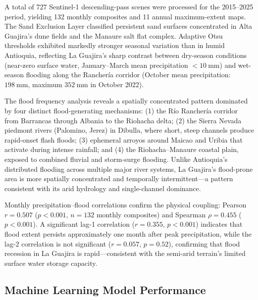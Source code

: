 \documentclass{article}
\begin{document}
A total of 727 Sentinel-1 descending-pass scenes were processed for the 2015--2025 period, yielding 132 monthly composites and 11 annual maximum-extent maps. The Sand Exclusion Layer classified persistent sand surfaces concentrated in Alta Guajira's dune fields and the Manaure salt flat complex. Adaptive Otsu thresholds exhibited markedly stronger seasonal variation than in humid Antioquia, reflecting La Guajira's sharp contrast between dry-season conditions (near-zero surface water, January--March mean precipitation $< \SI{10}{\milli\metre}$) and wet-season flooding along the Rancher\'ia corridor (October mean precipitation: $\SI{198}{\milli\metre}$, maximum $\SI{352}{\milli\metre}$ in October 2022).

The flood frequency analysis reveals a spatially concentrated pattern dominated by four distinct flood-generating mechanisms: (1) the R\'io Rancher\'ia corridor from Barrancas through Albania to the Riohacha delta; (2) the Sierra Nevada piedmont rivers (Palomino, Jerez) in Dibulla, where short, steep channels produce rapid-onset flash floods; (3) ephemeral arroyos around Maicao and Uribia that activate during intense rainfall; and (4) the Riohacha--Manaure coastal plain, exposed to combined fluvial and storm-surge flooding. Unlike Antioquia's distributed flooding across multiple major river systems, La Guajira's flood-prone area is more spatially concentrated and temporally intermittent---a pattern consistent with its arid hydrology and single-channel dominance.

Monthly precipitation--flood correlations confirm the physical coupling: Pearson $r = 0.507$ ($p < 0.001$, $n = 132$ monthly composites) and Spearman $\rho = 0.455$ ($p < 0.001$). A significant lag-1 correlation ($r = 0.355$, $p < 0.001$) indicates that flood extent persists approximately one month after peak precipitation, while the lag-2 correlation is not significant ($r = 0.057$, $p = 0.52$), confirming that flood recession in La Guajira is rapid---consistent with the semi-arid terrain's limited surface water storage capacity.

\subsection{Machine Learning Model Performance}
\end{document}
